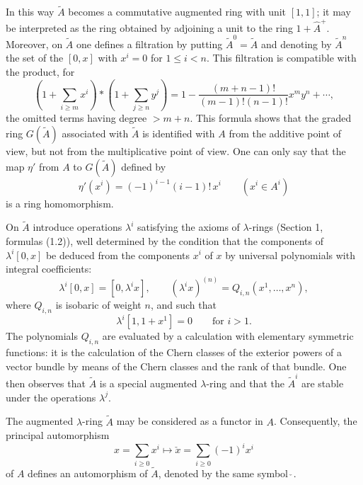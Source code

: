 \documentclass[11pt]{article}
\providecommand{\Ahp}{\widehat A^{+}}
\begin{document}
In this way $\widetilde A$ becomes a commutative augmented ring with unit $[1,1]$; it may be interpreted as the ring obtained by adjoining a unit to the ring $1+\Ahp$. Moreover, on $\widetilde A$ one defines a filtration by putting $\widetilde A^0=\widetilde A$ and denoting by $\widetilde A^n$ the set of the $[0,x]$ with $x^i=0$ for $1\leq i<n$. This filtration is compatible with the product, for
\begin{equation}\tag{1.18}
\left(1+\sum_{i\geq m}x^i\right)*\left(1+\sum_{j\geq n}y^j\right)
=1-\frac{(m+n-1)!}{(m-1)!(n-1)!}x^m y^n+\cdots,
\end{equation}
the omitted terms having degree $>m+n$. This formula shows that the graded ring $G(\widetilde A)$ associated with $\widetilde A$ is identified with $A$ from the additive point of view, but not from the multiplicative point of view. One can only say that the map $\eta'$ from $A$ to $G(\widetilde A)$ defined by
\begin{equation}\tag{1.19}
\eta'(x^i)=(-1)^{i-1}(i-1)!\,x^i\qquad (x^i\in A^i)
\end{equation}
is a ring homomorphism.

On $\widetilde A$ introduce operations $\lambda^i$ satisfying the axioms of $\lambda$-rings (Section 1, formulas (1.2)), well determined by the condition that the components of $\lambda^i[0,x]$ be deduced from the components $x^i$ of $x$ by universal polynomials with integral coefficients:
\begin{equation}\tag{1.20}
\lambda^i[0,x]=[0,\lambda^i x],\qquad (\lambda^i x)^{(n)}=Q_{i,n}(x^1,\ldots,x^n),
\end{equation}
where $Q_{i,n}$ is isobaric of weight $n$, and such that
\begin{equation}\tag{1.21}
\lambda^i[1,1+x^1]=0\qquad\text{for }i>1.
\end{equation}
The polynomials $Q_{i,n}$ are evaluated by a calculation with elementary symmetric functions: it is the calculation of the Chern classes of the exterior powers of a vector bundle by means of the Chern classes and the rank of that bundle. One then observes that $\widetilde A$ is a special augmented $\lambda$-ring and that the $\widetilde A^i$ are stable under the operations $\lambda^j$.

The augmented $\lambda$-ring $\widetilde A$ may be considered as a functor in $A$. Consequently, the principal automorphism
\[
x=\sum_{i\geq 0}x^i\longmapsto \check x=\sum_{i\geq 0}(-1)^i x^i
\]
of $A$ defines an automorphism of $\widetilde A$, denoted by the same symbol $\check{\ }$.
\end{document}
